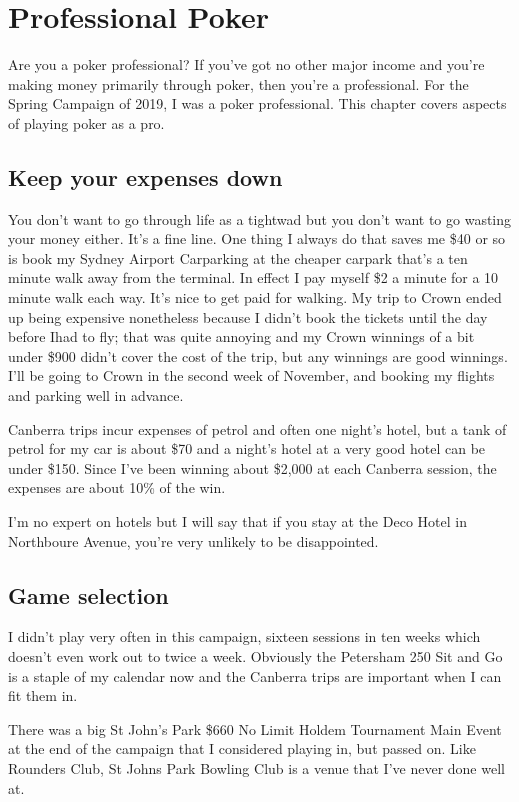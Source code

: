 \chapter{Professional Poker}

Are you a poker professional? If you've got no other major income and
you're making money primarily through poker, then you're a
professional. For the Spring Campaign of 2019, I was a poker
professional. This chapter covers aspects of playing poker as a pro.

\section*{Keep your expenses down}

You don't want to go through life as a tightwad but you don't want to
go wasting your money either. It's a fine line. One thing I always do
that saves me \$40 or so is book my Sydney Airport Carparking at the
cheaper carpark that's a ten minute walk away from the
terminal. In effect I pay myself \$2 a minute for a 10 minute walk
each way. It's nice to get paid for walking. My trip to Crown ended up
being expensive nonetheless because I didn't book the tickets until
the day before Ihad to fly; that was quite annoying and my Crown
winnings of a bit under \$900 didn't cover the cost of the trip, but
any winnings are good winnings. I'll be going to Crown in the second
week of November, and booking my flights and parking well in advance.

Canberra trips incur expenses of petrol and often one night's hotel,
but a tank of petrol for my car is about \$70 and a night's hotel at
a very good hotel can be under \$150. Since I've been winning about
\$2,000 at each Canberra session, the expenses are about 10\% of
the win.

I'm no expert on hotels but I will say that if you stay at the Deco
Hotel in Northboure Avenue, you're very unlikely to be disappointed.

\section*{Game selection}

I didn't play very often in this campaign, sixteen sessions in ten
weeks which doesn't even work out to twice a week. Obviously the
Petersham 250 Sit and Go is a staple of my calendar now and the
Canberra trips are important when I can fit them in.

There was a big St John's Park \$660 No Limit Holdem Tournament Main
Event at the end of the campaign that I considered playing in, but
passed on. Like Rounders Club, St Johns Park Bowling Club is
a venue that I've never done well at.

